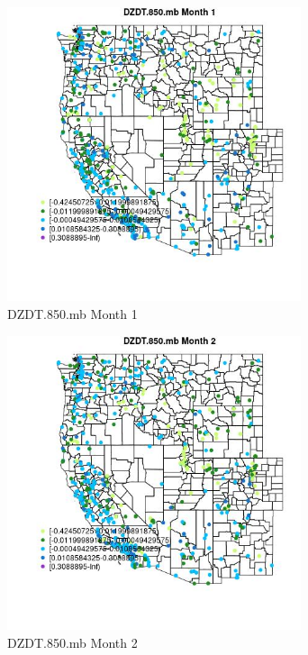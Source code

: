 \begin{figure} 
\centering  
\includegraphics[width=0.77\textwidth]{Code_Outputs/Report_ML_input_PM25_Step4_part_e_de_duplicated_aves_compiled_2019-05-14wNAs_MapObsMo1DZDT850mb.jpg} 
\caption{\label{fig:Report_ML_input_PM25_Step4_part_e_de_duplicated_aves_compiled_2019-05-14wNAsMapObsMo1DZDT850mb}DZDT.850.mb Month 1} 
\end{figure} 
 

\begin{figure} 
\centering  
\includegraphics[width=0.77\textwidth]{Code_Outputs/Report_ML_input_PM25_Step4_part_e_de_duplicated_aves_compiled_2019-05-14wNAs_MapObsMo2DZDT850mb.jpg} 
\caption{\label{fig:Report_ML_input_PM25_Step4_part_e_de_duplicated_aves_compiled_2019-05-14wNAsMapObsMo2DZDT850mb}DZDT.850.mb Month 2} 
\end{figure} 
 

